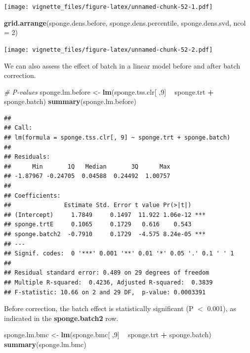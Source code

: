 \documentclass[]{book}
\newenvironment{Shaded}{\begin{snugshade}}{\end{snugshade}}
\newcommand{\KeywordTok}[1]{\textcolor[rgb]{0.13,0.29,0.53}{\textbf{#1}}}
\newcommand{\DataTypeTok}[1]{\textcolor[rgb]{0.13,0.29,0.53}{#1}}
\newcommand{\DecValTok}[1]{\textcolor[rgb]{0.00,0.00,0.81}{#1}}
\newcommand{\StringTok}[1]{\textcolor[rgb]{0.31,0.60,0.02}{#1}}
\newcommand{\CommentTok}[1]{\textcolor[rgb]{0.56,0.35,0.01}{\textit{#1}}}
\newcommand{\OperatorTok}[1]{\textcolor[rgb]{0.81,0.36,0.00}{\textbf{#1}}}
\newcommand{\NormalTok}[1]{#1}
\begin{document}
\texttt{[image: vignette\_files/figure-latex/unnamed-chunk-52-1.pdf]}

\begin{Shaded}
\begin{Highlighting}[]
\KeywordTok{grid.arrange}\NormalTok{(sponge.dens.before, sponge.dens.percentile, }
\NormalTok{             sponge.dens.svd, }\DataTypeTok{ncol =} \DecValTok{2}\NormalTok{)}
\end{Highlighting}
\end{Shaded}

\texttt{[image: vignette\_files/figure-latex/unnamed-chunk-52-2.pdf]}

We can also assess the effect of batch in a linear model before and
after batch correction.

\begin{Shaded}
\begin{Highlighting}[]
\CommentTok{# P-values}
\NormalTok{sponge.lm.before <-}\StringTok{ }\KeywordTok{lm}\NormalTok{(sponge.tss.clr[ ,}\DecValTok{9}\NormalTok{] }\OperatorTok{~}\StringTok{ }\NormalTok{sponge.trt }\OperatorTok{+}\StringTok{ }\NormalTok{sponge.batch)}
\KeywordTok{summary}\NormalTok{(sponge.lm.before)}
\end{Highlighting}
\end{Shaded}

\begin{verbatim}
## 
## Call:
## lm(formula = sponge.tss.clr[, 9] ~ sponge.trt + sponge.batch)
## 
## Residuals:
##      Min       1Q   Median       3Q      Max 
## -1.87967 -0.24705  0.04588  0.24492  1.00757 
## 
## Coefficients:
##               Estimate Std. Error t value Pr(>|t|)    
## (Intercept)     1.7849     0.1497  11.922 1.06e-12 ***
## sponge.trtE     0.1065     0.1729   0.616    0.543    
## sponge.batch2  -0.7910     0.1729  -4.575 8.24e-05 ***
## ---
## Signif. codes:  0 '***' 0.001 '**' 0.01 '*' 0.05 '.' 0.1 ' ' 1
## 
## Residual standard error: 0.489 on 29 degrees of freedom
## Multiple R-squared:  0.4236, Adjusted R-squared:  0.3839 
## F-statistic: 10.66 on 2 and 29 DF,  p-value: 0.0003391
\end{verbatim}

Before correction, the batch effect is statistically significant (P
\(<\) 0.001), as indicated in the \textbf{sponge.batch2} row.

\begin{Shaded}
\begin{Highlighting}[]
\NormalTok{sponge.lm.bmc <-}\StringTok{ }\KeywordTok{lm}\NormalTok{(sponge.bmc[ ,}\DecValTok{9}\NormalTok{] }\OperatorTok{~}\StringTok{ }\NormalTok{sponge.trt }\OperatorTok{+}\StringTok{ }\NormalTok{sponge.batch)}
\KeywordTok{summary}\NormalTok{(sponge.lm.bmc)}
\end{Highlighting}
\end{Shaded}
\end{document}

